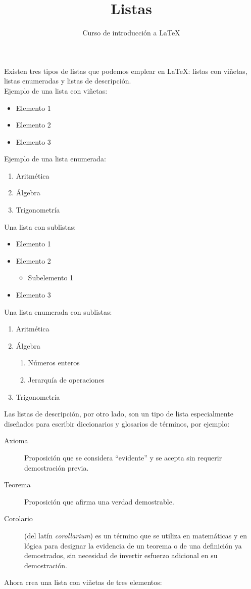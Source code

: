 \documentclass[10pt,letterpaper]{article}
\title{Listas}
\author{Curso de introducción a LaTeX}
\begin{document}
\maketitle

Existen tres tipos de listas que podemos emplear en \LaTeX: listas con viñetas, listas enumeradas y listas de descripción.\\

\noindent Ejemplo de una lista con viñetas:
\begin{itemize}
   	\item Elemento 1		
    \item Elemento 2
   	\item Elemento 3
\end{itemize}

\noindent Ejemplo de una lista enumerada:
\begin{enumerate}
    \item Aritmética
    \item Álgebra
    \item Trigonometría
\end{enumerate}

\noindent Una lista con sublistas: 
\begin{itemize}
   \item Elemento 1
   \item Elemento 2
           \begin{itemize}
               \item Subelemento 1
           \end{itemize}
    \item Elemento 3
\end{itemize}

\noindent Una lista enumerada con sublistas: 
\begin{enumerate}
    \item Aritmética
    \item Álgebra
       	\begin{enumerate}
   	    	\item Números enteros
   	    	\item Jerarquía de operaciones
       	\end{enumerate}
    \item Trigonometría
\end{enumerate}

\noindent Las listas de descripción, por otro lado, son un tipo de lista especialmente diseñados para escribir diccionarios y glosarios de términos, por ejemplo:

\begin{description}
  \item[Axioma] Proposición que se considera ``evidente'' y se acepta sin requerir demostración previa.
  \item[Teorema] Proposición que afirma una verdad demostrable.
  \item[Corolario] (del latín \emph{corollarium}) es un término que se utiliza en matemáticas y en lógica para designar la evidencia de un teorema o de una definición ya demostrados, sin necesidad de invertir esfuerzo adicional en su demostración.
\end{description}

\noindent Ahora crea una lista con viñetas de tres elementos:
\end{document}

